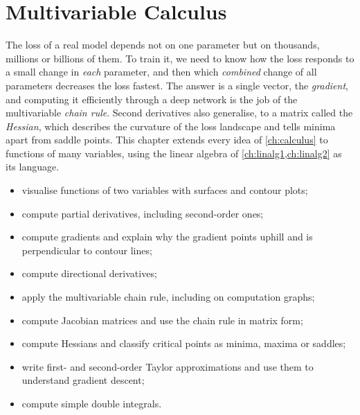 \chapter{Multivariable Calculus}\label{ch:multivariable}

\begin{motivation}
The loss of a real model depends not on one parameter but on thousands,
millions or billions of them. To train it, we need to know how the loss
responds to a small change in \emph{each} parameter, and then which
\emph{combined} change of all parameters decreases the loss fastest. The answer
is a single vector, the \emph{gradient}, and computing it efficiently through a
deep network is the job of the multivariable \emph{chain rule}. Second
derivatives also generalise, to a matrix called the \emph{Hessian}, which
describes the curvature of the loss landscape and tells minima apart from
saddle points. This chapter extends every idea of \cref{ch:calculus} to
functions of many variables, using the linear algebra of
\cref{ch:linalg1,ch:linalg2} as its language.
\end{motivation}

\begin{objectives}
\begin{itemize}
  \item visualise functions of two variables with surfaces and contour plots;
  \item compute partial derivatives, including second-order ones;
  \item compute gradients and explain why the gradient points uphill and is
    perpendicular to contour lines;
  \item compute directional derivatives;
  \item apply the multivariable chain rule, including on computation graphs;
  \item compute Jacobian matrices and use the chain rule in matrix form;
  \item compute Hessians and classify critical points as minima, maxima or
    saddles;
  \item write first- and second-order Taylor approximations and use them to
    understand gradient descent;
  \item compute simple double integrals.
\end{itemize}
\end{objectives}

